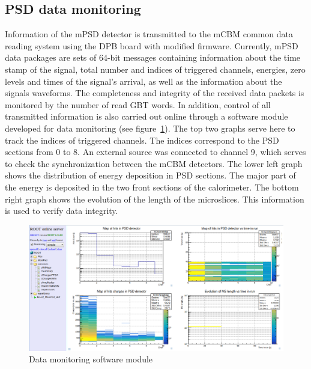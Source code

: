 \documentclass[a4paper,11pt]{article}
\begin{document}
\subsection{PSD data monitoring}
Information of the mPSD detector is transmitted to the mCBM common data reading system using the DPB board with modified firmware. Currently, mPSD data packages are sets of 64-bit messages containing information about the time stamp of the signal, total number and indices of triggered channels, energies, zero levels and times of the signal's arrival, as well as the information about the signals waveforms.
The completeness and integrity of the received data packets is monitored by the number of read GBT words. In addition, control of all transmitted information is also carried out online through a software module developed for data monitoring (see figure~\ref{fig:5}). The top two graphs serve here to track the indices of triggered channels. The indices correspond to the PSD sections from 0 to 8. An external source was connected to channel 9, which serves to check the synchronization between the mCBM detectors. The lower left graph shows the distribution of energy deposition in PSD sections. The major part of the energy is deposited in the two front sections of the calorimeter. The bottom right graph shows the evolution of the length of the microslices. This information is used to verify data integrity.

\begin{figure}[htbp]
\centering %
\includegraphics[width=\textwidth]{run582.png}
\caption{\label{fig:5} Data monitoring software module}
\end{figure}
\end{document}
